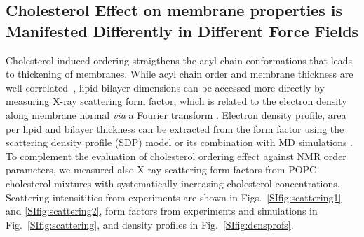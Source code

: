 \documentclass[journal=jctcce]{achemso}
\begin{document}



\subsection{Cholesterol Effect on membrane properties is Manifested Differently in Different Force Fields}

Cholesterol induced ordering straigthens the acyl chain conformations that leads to thickening of membranes. While acyl chain order and membrane thickness are well correlated~\cite{NMRlipidsDatabank}, lipid bilayer dimensions can be accessed more directly by measuring X-ray scattering form factor, which is related to the electron density along membrane normal \textit{via} a Fourier transform \cite{pan12,Heftberger15,Marquardt15,ollila16}. Electron density profile, area per lipid and bilayer thickness can be extracted from the form factor using the scattering density profile (SDP) model or its combination with MD simulations  \cite{Kucerka08a,pan12,Heftberger15,Marquardt15,doktorova2020molecular}. 
To complement the evaluation of cholesterol ordering effect against NMR order parameters, we measured also X-ray scattering form factors from POPC-cholesterol mixtures with systematically increasing cholesterol concentrations. 
%
Scattering intensitities from experiments are shown in Figs.~\ref{SIfig:scattering1} and \ref{SIfig:scattering2}, form factors from experiments and simulations in Fig.~\ref{SIfig:scattering}, and density profiles in Fig.~\ref{SIfig:densprofs}.
\end{document}
